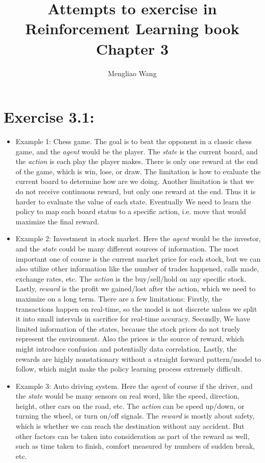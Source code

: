 \documentclass[10pt,letterpaper]{article}
\title{Attempts to exercise in Reinforcement Learning book Chapter 3}
\author{Mengliao Wang}
\begin{document}
\maketitle



\section*{Exercise 3.1: }
\label{3.1}

\begin{itemize}
\item Example 1: Chess game. The goal is to beat the opponent in a classic chess game, and the \textit{agent} would be the player. The \textit{state} is the current board, and the \textit{action} is each play the player makes. There is only one reward at the end of the game, which is win, lose, or draw. The limitation is how to evaluate the current board to determine how are we doing. Another limitation is that we do not receive continuous reward, but only one reward at the end. Thus it is harder to evaluate the value of each state. Eventually We need to learn the policy to map each board status to a specific action, i.e. move that would maximize the final reward.
\item Example 2: Investment in stock market. Here the \textit{agent} would be the investor, and the \textit{state} could be many different sources of information. The most important one of course is the current market price for each stock, but we can also utilize other information like the number of trades happened, calls made, exchange rates, etc. The \textit{action} is the buy/sell/hold on any specific stock. Lastly, \textit{reward} is the profit we gained/lost after the action, which we need to maximize on a long term. There are a few limitations: Firstly, the transactions happen on real-time, so the model is not discrete unless we split it into small intervals in sacrifice for real-time accuracy. Secondly, We have limited information of the states, because the stock prices do not truely represent the environment. Also the prices is the source of reward, which might introduce confusion and potentially data correlation. Lastly, the rewards are highly nonstationary without a straight forward pattern/model to follow, which might make the policy learning process extremely difficult.
\item Example 3: Auto driving system. Here the \textit{agent} of course if the driver, and the \textit{state} would be many sensors on real word, like the speed, direction, height, other cars on the road, etc. The \textit{action} can be speed up/down, or turning the wheel, or turn on/off signals. The \textit{reward} is mostly about safety, which is whether we can reach the destination without any accident. But other factors can be taken into consideration as part of the reward as well, such as time taken to finish, comfort measured by numbers of sudden break, etc.
\end{itemize}
\end{document}
